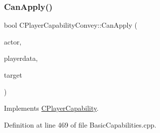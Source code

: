 \subsubsection{\texorpdfstring{Can\+Apply()}{CanApply()}}
{\footnotesize\ttfamily bool C\+Player\+Capability\+Convey\+::\+Can\+Apply (\begin{DoxyParamCaption}\item[{std\+::shared\+\_\+ptr$<$ \hyperlink{classCPlayerAsset}{C\+Player\+Asset} $>$}]{actor,  }\item[{std\+::shared\+\_\+ptr$<$ \hyperlink{classCPlayerData}{C\+Player\+Data} $>$}]{playerdata,  }\item[{std\+::shared\+\_\+ptr$<$ \hyperlink{classCPlayerAsset}{C\+Player\+Asset} $>$}]{target }\end{DoxyParamCaption})\hspace{0.3cm}{\ttfamily [virtual]}}



Implements \hyperlink{classCPlayerCapability_ae96263e0950f496492f8baeb877b9554}{C\+Player\+Capability}.



Definition at line 469 of file Basic\+Capabilities.\+cpp.


